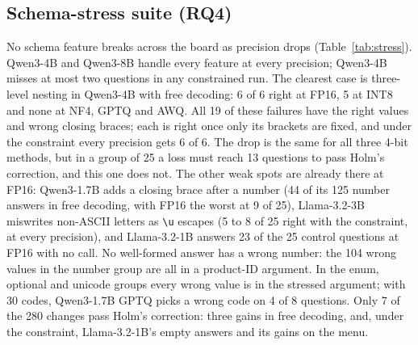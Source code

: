 \documentclass[conference]{IEEEtran}
\begin{document}
\subsection{Schema-stress suite (RQ4)}
No schema feature breaks across the board as precision drops (Table~\ref{tab:stress}). Qwen3-4B and Qwen3-8B handle
every feature at every precision; Qwen3-4B misses at most two questions in any constrained run. The clearest case
is three-level nesting in Qwen3-4B with free decoding: 6 of 6 right at FP16, 5 at INT8 and none at NF4, GPTQ and
AWQ. All 19 of these failures have the right values and wrong closing braces; each is right once only its brackets
are fixed, and under the constraint every precision gets 6 of 6. The drop is the same for all three 4-bit methods,
but in a group of 25 a loss must reach 13 questions to pass Holm's correction, and this one does not. The other weak
spots are already there at FP16: Qwen3-1.7B adds a closing brace after a number (44 of its 125 number answers in
free decoding, with FP16 the worst at 9 of 25), Llama-3.2-3B miswrites non-ASCII letters as
\texttt{\textbackslash u} escapes (5 to 8 of 25 right with the constraint, at every precision), and Llama-3.2-1B
answers 23 of the 25 control questions at FP16 with no call. No well-formed answer has a wrong number: the 104 wrong
values in the number group are all in a product-ID argument. In the enum, optional and unicode groups every wrong
value is in the stressed argument; with 30 codes, Qwen3-1.7B GPTQ picks a wrong code on 4 of 8 questions. Only 7
of the 280 changes pass Holm's correction: three gains in free decoding, and, under the constraint, Llama-3.2-1B's
empty answers and its gains on the menu.
\end{document}
